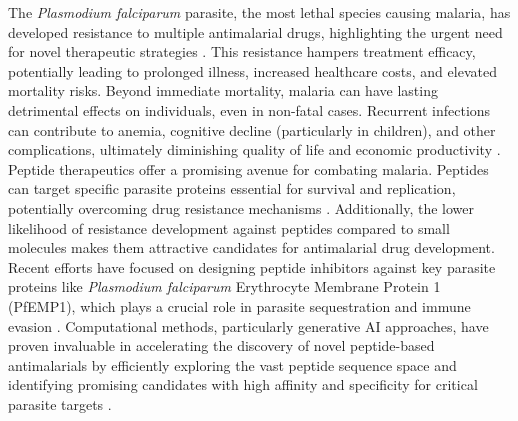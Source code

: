 The \textit{Plasmodium falciparum} parasite, the most lethal species causing malaria, has developed
resistance to multiple antimalarial drugs, highlighting the urgent need for novel therapeutic
strategies \cite{fairhurst2012artemisinin}. This resistance hampers treatment
efficacy, potentially leading to prolonged illness, increased healthcare costs, and elevated
mortality risks. Beyond immediate mortality, malaria can have lasting detrimental effects on
individuals, even in non-fatal cases. Recurrent infections can contribute to anemia, cognitive
decline (particularly in children), and other complications, ultimately diminishing quality of life
and economic productivity \cite{shukla2023supervised}. \\

Peptide therapeutics offer a promising avenue for combating malaria. Peptides can target specific
parasite proteins essential for survival and replication, potentially overcoming drug resistance
mechanisms \cite{li2009pfemp1}. Additionally, the lower likelihood of resistance development against
peptides compared to small molecules makes them attractive candidates for antimalarial drug
development. Recent efforts have focused on designing peptide inhibitors against key parasite
proteins like \textit{Plasmodium falciparum} Erythrocyte Membrane Protein 1 (PfEMP1), which plays a
crucial role in parasite sequestration and immune evasion \cite{jensen2020cerebral}. Computational methods, particularly
generative AI approaches, have proven invaluable in accelerating the discovery of novel
peptide-based antimalarials by efficiently exploring the vast peptide sequence space and identifying
promising candidates with high affinity and specificity for critical parasite targets
\cite{chang2022rational}.
